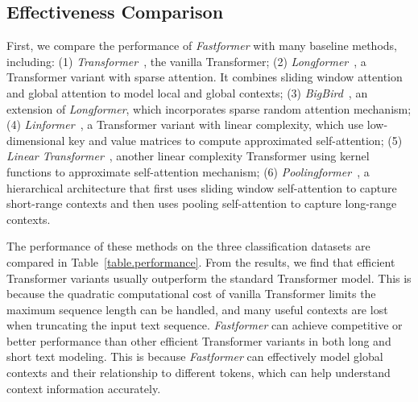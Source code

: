 \documentclass[11pt,a4paper]{article}
\begin{document}
\subsection{Effectiveness Comparison}

First, we compare the performance of \textit{Fastformer} with many baseline methods, including:
(1) \textit{Transformer}~\cite{vaswani2017attention}, the vanilla Transformer;
(2) \textit{Longformer}~\cite{beltagy2020longformer}, a   Transformer variant with sparse attention. It combines sliding window attention and global attention to model local and global contexts;
(3) \textit{BigBird}~\cite{zaheer2020big}, an extension of  \textit{Longformer}, which incorporates sparse random attention mechanism;
(4) \textit{Linformer}~\cite{wang2020linformer}, a Transformer variant with linear complexity, which use low-dimensional key and value matrices to compute approximated self-attention; 
(5) \textit{Linear Transformer}~\cite{katharopoulos2020transformers}, another linear complexity Transformer using kernel functions to approximate self-attention mechanism;
(6) \textit{Poolingformer}~\cite{zhang2021pooling}, a hierarchical architecture that first uses sliding window self-attention to capture short-range contexts and then uses pooling self-attention to capture long-range contexts.



The performance of these methods on the three classification datasets are compared in Table~\ref{table.performance}.
From the results, we find that efficient Transformer variants usually outperform the standard Transformer model.
This is because the quadratic computational cost of vanilla Transformer limits the maximum sequence length can be handled, and many useful contexts are lost when truncating the input text sequence.
\textit{Fastformer} can achieve competitive or better performance than other efficient Transformer variants in both long and short text modeling.
This is because \textit{Fastformer} can effectively model global contexts and their relationship to different tokens, which can help understand context information accurately.
\end{document}
